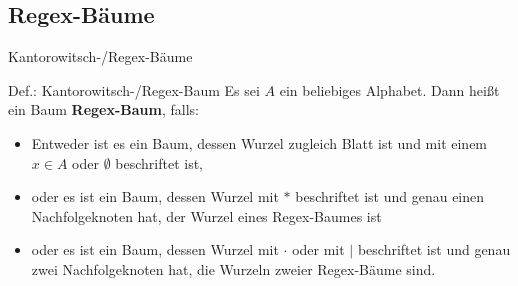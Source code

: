 \subsection{Regex-Bäume}
\begin{frame}{Kantorowitsch-/Regex-Bäume}
    \begin{block}{Def.: Kantorowitsch-/Regex-Baum}
    \small
    	Es sei $A$ ein beliebiges Alphabet. Dann heißt ein Baum \textbf{Regex-Baum}, falls:
    	\begin{itemize}
    		\item Entweder ist es ein Baum, dessen Wurzel zugleich Blatt ist und mit einem $x\in A$ oder $\emptyset$ beschriftet ist,
    		\item oder es ist ein Baum, dessen Wurzel mit $*$ beschriftet ist und genau einen Nachfolgeknoten hat, der Wurzel eines Regex-Baumes ist
    		\item oder es ist ein Baum, dessen Wurzel mit $\cdot$ oder mit $|$ beschriftet ist und genau zwei Nachfolgeknoten hat, die Wurzeln zweier Regex-Bäume sind. 
    	\end{itemize}
    \end{block}


      



    
\end{frame}

